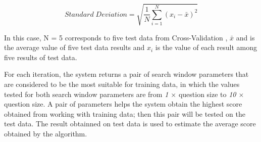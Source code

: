 \begin{equation}
\label{equation: standard deviation}
	Standard \; Deviation = \sqrt{\dfrac{1}{N} \sum_{i=1}^N (x_i -\bar{x} )^2 }
\end{equation}


In this case, N = 5 corresponds to five test data from Cross-Validation , \ensuremath{\bar{x}} and is the average value of five test data results and \ensuremath{x_i} is the value of each result among five results of test data.

For each iteration, the system returns a pair of search window parameters that are considered to be the most suitable for training data, in which the values tested for both search window parameters are  from \textit{1 \ensuremath{\times}} question size to \textit{10 \ensuremath{\times}} question size. A pair of parameters helps the system obtain the highest score obtained from working with training data; then this pair will be tested on the test data. The result obtainned on test data is used to estimate the average score obtained by the algorithm.



%
%

